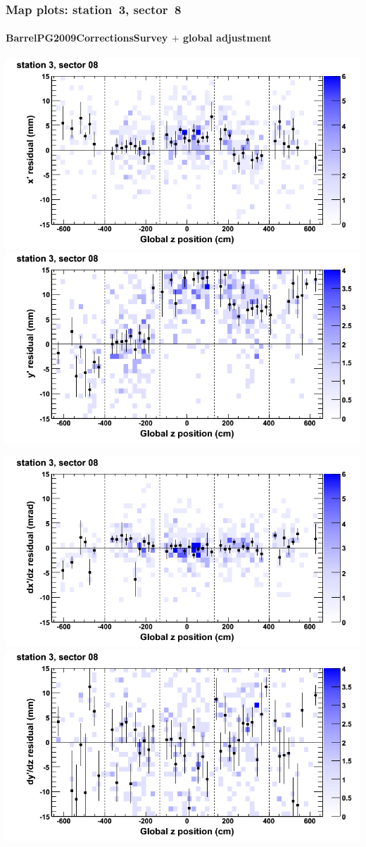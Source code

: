 \documentclass[compress]{beamer}
\begin{document}
\begin{frame}
\frametitle{Map plots: station~3, sector~8}
\framesubtitle{BarrelPG2009CorrectionsSurvey $+$ global adjustment}
\includegraphics[width=0.5\linewidth]{mapplots_re01/DTvsz_st3sec08_x.png}
\includegraphics[width=0.5\linewidth]{mapplots_re01/DTvsz_st3sec08_y.png}

\includegraphics[width=0.5\linewidth]{mapplots_re01/DTvsz_st3sec08_dxdz.png}
\includegraphics[width=0.5\linewidth]{mapplots_re01/DTvsz_st3sec08_dydz.png}
\end{frame}
\end{document}
